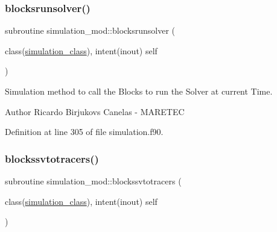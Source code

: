 \subsubsection{\texorpdfstring{blocksrunsolver()}{blocksrunsolver()}}
{\footnotesize\ttfamily subroutine simulation\+\_\+mod\+::blocksrunsolver (\begin{DoxyParamCaption}\item[{class(\mbox{\hyperlink{structsimulation__mod_1_1simulation__class}{simulation\+\_\+class}}), intent(inout)}]{self }\end{DoxyParamCaption})\hspace{0.3cm}{\ttfamily [private]}}



Simulation method to call the Blocks to run the Solver at current Time. 

\begin{DoxyAuthor}{Author}
Ricardo Birjukovs Canelas -\/ M\+A\+R\+E\+T\+EC 
\end{DoxyAuthor}


Definition at line 305 of file simulation.\+f90.


\mbox{\label{namespacesimulation__mod_a5eeea0cb6e0e94c5fd0336a13d635866}} 
\subsubsection{\texorpdfstring{blockssvtotracers()}{blockssvtotracers()}}
{\footnotesize\ttfamily subroutine simulation\+\_\+mod\+::blockssvtotracers (\begin{DoxyParamCaption}\item[{class(\mbox{\hyperlink{structsimulation__mod_1_1simulation__class}{simulation\+\_\+class}}), intent(inout)}]{self }\end{DoxyParamCaption})\hspace{0.3cm}{\ttfamily [private]}}



